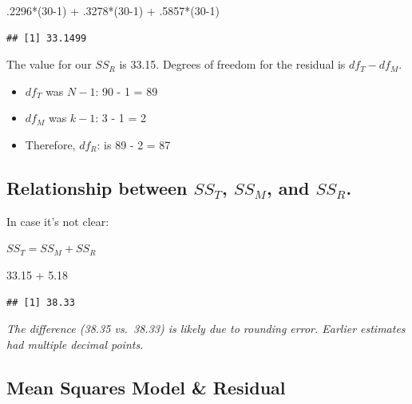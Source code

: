 \documentclass[
  english,
]{book}
\newenvironment{Shaded}{\begin{snugshade}}{\end{snugshade}}
\newcommand{\DecValTok}[1]{\textcolor[rgb]{0.00,0.00,0.81}{#1}}
\newcommand{\FloatTok}[1]{\textcolor[rgb]{0.00,0.00,0.81}{#1}}
\newcommand{\NormalTok}[1]{#1}
\newcommand{\SpecialCharTok}[1]{\textcolor[rgb]{0.00,0.00,0.00}{#1}}
\providecommand{\tightlist}{%
  \setlength{\itemsep}{0pt}\setlength{\parskip}{0pt}}
\begin{document}
\begin{Shaded}
\begin{Highlighting}[]
\NormalTok{.}\DecValTok{2296}\SpecialCharTok{*}\NormalTok{(}\DecValTok{30{-}1}\NormalTok{) }\SpecialCharTok{+}\NormalTok{ .}\DecValTok{3278}\SpecialCharTok{*}\NormalTok{(}\DecValTok{30{-}1}\NormalTok{) }\SpecialCharTok{+}\NormalTok{ .}\DecValTok{5857}\SpecialCharTok{*}\NormalTok{(}\DecValTok{30{-}1}\NormalTok{)}
\end{Highlighting}
\end{Shaded}

\begin{verbatim}
## [1] 33.1499
\end{verbatim}

The value for our \(SS_R\) is 33.15. Degrees of freedom for the residual is \(df_T - df_M\).

\begin{itemize}
\tightlist
\item
  \(df_T\) was \(N-1\): 90 - 1 = 89
\item
  \(df_M\) was \(k - 1\): 3 - 1 = 2
\item
  Therefore, \(df_R\): is 89 - 2 = 87
\end{itemize}

\hypertarget{relationship-between-ss_t-ss_m-and-ss_r.}{%
\subsection{\texorpdfstring{Relationship between \(SS_T\), \(SS_M\), and \(SS_R\).}{Relationship between SS\_T, SS\_M, and SS\_R.}}\label{relationship-between-ss_t-ss_m-and-ss_r.}}

In case it's not clear:

\(SS_T = SS_M + SS_R\)

\begin{Shaded}
\begin{Highlighting}[]
\FloatTok{33.15} \SpecialCharTok{+} \FloatTok{5.18}
\end{Highlighting}
\end{Shaded}

\begin{verbatim}
## [1] 38.33
\end{verbatim}

\emph{The difference (38.35 vs.~38.33) is likely due to rounding error. Earlier estimates had multiple decimal points.}

\hypertarget{mean-squares-model-residual}{%
\subsection{Mean Squares Model \& Residual}\label{mean-squares-model-residual}}
\end{document}
